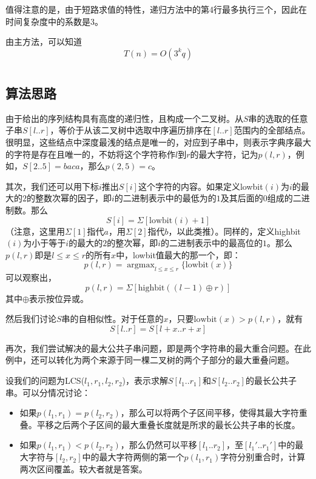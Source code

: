 \documentclass[UTF8]{ctexart}
\begin{document}
值得注意的是，由于短路求值的特性，递归方法中的第4行最多执行三个，因此在时间复杂度中的系数是$3$。

由主方法，可以知道
$$T(n) = O(3^kq)$$

\section{}
\subsection*{算法思路}
由于给出的序列结构具有高度的递归性，且构成一个二叉树。从$S$串的选取的任意子串$S[l..r]$，等价于从该二叉树中选取中序遍历排序在$[l..r]$范围内的全部结点。很明显，这些结点中深度最浅的结点是唯一的，对应到子串中，则表示字典序最大的字符是存在且唯一的，不妨将这个字符称作$l$到$r$的最大字符，记为$p(l, r)$，例如，$S[2..5]=baca$，那么$p(2, 5)=c$。

其次，我们还可以用下标$i$推出$S[i]$这个字符的内容。如果定义lowbit$(i)$为$i$的最大的$2$的整数次幂的因子，即$i$的二进制表示中的最低为的$1$及其后面的$0$组成的二进制数。那么
$$S[i]=\Sigma[\text{lowbit}(i)+1]$$
（注意，这里用$\Sigma[1]$指代$a$，用$\Sigma[2]$指代$b$，以此类推）。同样的，定义highbit$(i)$为小于等于$i$的最大的$2$的整次幂，即$i$的二进制表示中的最高位的$1$。那么$p(l, r)$即是$l\leq x\leq r$的所有$x$中，lowbit值最大的那一个，即：
$$p(l, r) = \mathop{\arg\max}_{l\leq x\leq r}{\{\text{lowbit}(x)\}}$$
可以观察出，
$$p(l, r) = \Sigma[\text{highbit}((l-1)\oplus r)]$$
其中$\oplus$表示按位异或。

然后我们讨论$S$串的自相似性。对于任意的$x$，只要$\text{lowbit}(x) > p(l, r)$，就有
$$S[l..r] = S[l+x..r+x]$$

再次，我们尝试解决的最大公共子串问题，即是两个字符串的最大重合问题。在此例中，还可以转化为两个来源于同一棵二叉树的两个子部分的最大重叠问题。

设我们的问题为LCS($l_1, r_1, l_2, r_2$)，表示求解$S[l_1..r_1]$和$S[l_2..r_2]$的最长公共子串。可以分情况讨论：

\begin{itemize}
    \item 如果$p(l_1, r_1)=p(l_2, r_2)$，那么可以将两个子区间平移，使得其最大字符重叠。平移之后两个子区间的最大重叠长度就是所求的最长公共子串的长度。
    \item 如果$p(l_1, r_1) < p(l_2, r_2)$，那么仍然可以平移$[l_1..r_2]$，至$[l_1'..r_1']$中的最大字符与$[l_2, r_2]$中的最大字符两侧的第一个$p(l_1, r_1)$字符分别重合时，计算两次区间覆盖。较大者就是答案。
\end{itemize}
\end{document}
